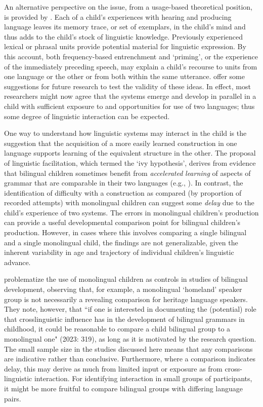 \documentclass[output=paper]{langscibook}
\begin{document}
An alternative perspective on the issue, from a usage-based theoretical position, is provided by  \citet{GaskinsEtAl2021}. Each of a child’s experiences with hearing and producing language leaves its memory trace, or set of exemplars, in the child’s mind and thus adds to the child’s stock of linguistic knowledge. Previously experienced lexical or phrasal units provide potential material for linguistic expression. By this account, both frequency-based entrenchment and ‘priming’, or the experience of the immediately preceding speech, may explain a child’s recourse to units from one language or the other or from both within the same utterance. \citet{GaskinsEtAl2022} offer some suggestions for future research to test the validity of these ideas. In effect, most researchers might now agree that the systems emerge and develop in parallel in a child with sufficient exposure to and opportunities for use of two languages; thus some degree of linguistic interaction can be expected.

One way to understand how linguistic systems may interact in the child is the suggestion that the acquisition of a more easily learned construction in one language supports learning of the equivalent structure in the other. The proposal of linguistic facilitation, which \citet{BernardiniSchlyter2004} termed the ‘ivy hypothesis’, derives from evidence that bilingual children sometimes benefit from \textit{accelerated} \textit{learning} of aspects of grammar that are comparable in their two languages (e.g., \citealt{Kupisch2007}). In contrast, the identification of difficulty with a construction as compared (by proportion of recorded attempts) with monolingual children can suggest some \textit{delay} due to the child’s experience of two systems. The errors in monolingual children’s production can provide a useful developmental comparison point for bilingual children’s production. However, in cases where this involves comparing a single bilingual and a single monolingual child, the findings are not generalizable, given the inherent variability in age and trajectory of individual children’s linguistic advance.

\citet{RothmanEtAl2023} problematize the use of monolingual children as controls in studies of bilingual development, observing that, for example, a monolingual ‘homeland’ speaker group is not necessarily a revealing comparison for heritage language speakers. They note, however, that ``if one is interested in documenting the (potential) role that crosslinguistic influence has in the development of bilingual grammars in childhood, it could be reasonable to compare a child bilingual group to a monolingual one" (2023: 319), as long as it is motivated by the research question. The small sample size in the studies discussed here means that any comparisons are indicative rather than conclusive. Furthermore, where a comparison indicates delay, this may derive as much from limited input or exposure as from cross-linguistic interaction. For identifying interaction in small groups of participants, it might be more fruitful to compare bilingual groups with differing language pairs.
\end{document}
